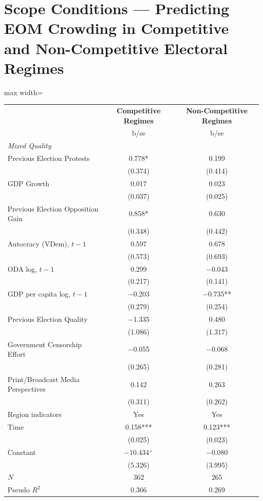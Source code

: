 \documentclass[USletter,12pt, titlepage]{article} %
\begin{document}
\section{Scope Conditions --- Predicting EOM Crowding in Competitive and Non-Competitive Electoral Regimes}
\begin{table}[H]
\centering
\begin{adjustbox}{max width=\textwidth}
\begin{threeparttable}
\begin{tabular}{lcc}
\toprule
 & \textbf{Competitive Regimes} & \textbf{Non-Competitive Regimes} \\
 & b/se & b/se \\
\midrule
\multicolumn{3}{l}{\textit{Mixed Quality}} \\
\midrule
Previous Election Protests & 0.778* & 0.199 \\
 & (0.374) & (0.414) \\
GDP Growth & 0.017 & 0.023 \\
 & (0.037) & (0.025) \\
Previous Election Opposition Gain & 0.858* & 0.630 \\
 & (0.348) & (0.442) \\
Autocracy (VDem), $t-1$ & 0.597 & 0.678 \\
 & (0.573) & (0.693) \\
ODA log, $t-1$ & 0.299 & $-$0.043 \\
 & (0.217) & (0.141) \\
GDP per capita log, $t-1$ & $-$0.203 & $-$0.735** \\
 & (0.279) & (0.254) \\
Previous Election Quality & $-$1.335 & 0.480 \\
 & (1.086) & (1.317) \\
Government Censorship Effort & $-$0.055 & $-$0.068 \\
 & (0.265) & (0.281) \\
Print/Broadcast Media Perspectives & 0.142 & 0.263 \\
 & (0.311) & (0.262) \\
Region indicators & Yes & Yes \\
Time & 0.158*** & 0.123*** \\
 & (0.025) & (0.023) \\
Constant & $-$10.434$^{+}$ & $-$0.080 \\
 & (5.326) & (3.995) \\
\midrule
$N$ & 362 & 265 \\
Pseudo $R^{2}$ & 0.366 & 0.269 \\

\end{tabular}
\end{threeparttable}
\end{adjustbox}
\end{table}
\end{document}

